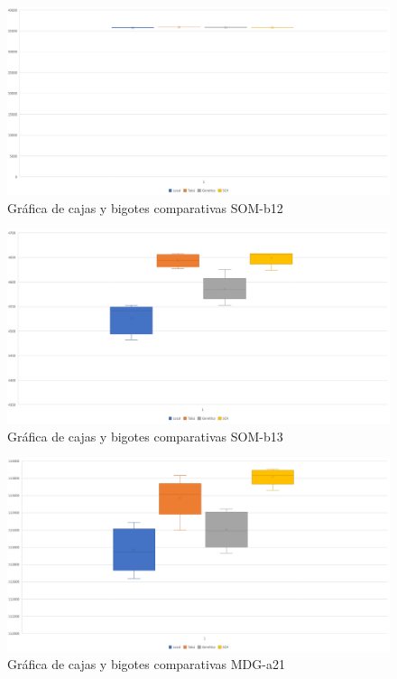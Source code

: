 	\begin{figure}[H]
		\centering
		\includegraphics[scale=0.3]{img/finalSOM2.png}
		\caption{Gráfica de cajas y bigotes comparativas SOM-b12}
		\label{SOM-b12_final}
	\end{figure}

	\begin{figure}[H]
		\centering
		\includegraphics[scale=0.3]{img/finalSOM3.png}
		\caption{Gráfica de cajas y bigotes comparativas SOM-b13}
		\label{SOM-b13_final}
	\end{figure}

	\begin{figure}[H]
		\centering
		\includegraphics[scale=0.3]{img/finalMDG1.png}
		\caption{Gráfica de cajas y bigotes comparativas MDG-a21}
		\label{MDG-a21_final}
	\end{figure}

